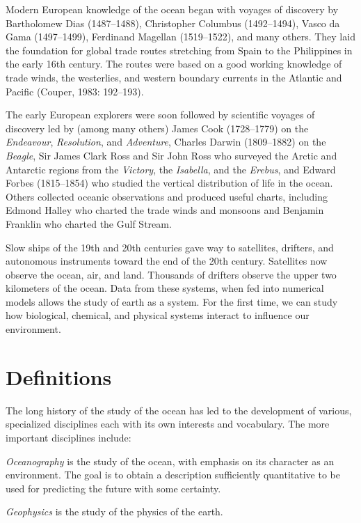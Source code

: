 Modern European knowledge of the ocean began with voyages of discovery
by Bartholomew Dias (1487--1488), Christopher Columbus (1492--1494),
Vasco da Gama (1497--1499), Ferdinand Magellan (1519--1522), and many
others. They laid the foundation for global trade routes stretching
from Spain to the Philippines in the early 16th century. The routes
were based on a good working knowledge of trade winds, the westerlies,
and western boundary currents in the Atlantic and Pacific (Couper,
1983: 192--193).

The early European explorers were soon followed by scientific voyages
of discovery led by (among many others) James Cook (1728--1779) on the
\textit{Endeavour}, \textit{Resolution}, and \textit{Adventure},
Charles Darwin (1809--1882) on the \textit{Beagle}, Sir James Clark
Ross and Sir John Ross who surveyed the Arctic and Antarctic regions
from the \textit{Victory}, the \textit{Isabella}, and the
\textit{Erebus}, and Edward Forbes (1815--1854) who studied the
vertical distribution of life in the ocean. Others collected oceanic
observations and produced useful charts, including Edmond Halley who
charted the trade winds and monsoons and Benjamin Franklin who charted
the Gulf Stream.

Slow ships of the 19th and 20th centuries gave way to satellites,
drifters, and autonomous instruments toward the end of the 20th
century. Satellites now observe the ocean, air, and land. Thousands of
drifters observe the upper two kilometers of the ocean. Data from
these systems, when fed into numerical models allows the study of
earth as a system.  For the first time, we can study how biological,
chemical, and physical systems interact to influence our environment.

\section{Definitions}
The long history of the study of the ocean has led to the development
of various, specialized disciplines each with its own interests and
vocabulary. The more important disciplines include:

\textit{Oceanography} is the study of the
ocean, with emphasis on its character as an environment. The goal is
to obtain a description sufficiently quantitative to be used for
predicting the future with some certainty.

\textit{Geophysics} is the study of the
physics of the earth.

